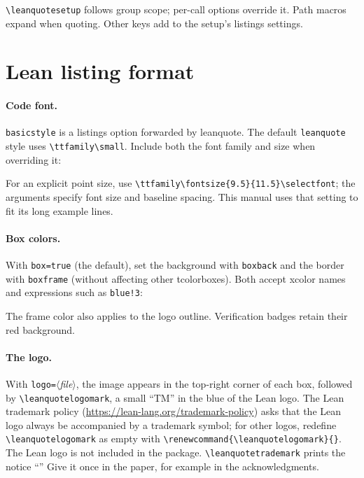 \documentclass[11pt]{article}
\newcommand{\meta}[1]{\ensuremath{\langle}\textit{#1}\ensuremath{\rangle}}
\newcommand{\cs}[1]{\texttt{\textbackslash #1}}
\newcommand{\opt}[1]{\texttt{#1}}
\begin{document}
\cs{leanquotesetup} follows group scope; per-call options override it. Path macros expand
when quoting. Other keys add to the setup's \textsf{listings} settings.

\section{Lean listing format}

\paragraph{Code font.} \opt{basicstyle} is a \textsf{listings} option forwarded by
\textsf{leanquote}. The default \texttt{leanquote} style uses \verb|\ttfamily\small|.
Include both the font family and size when overriding it:
\begin{latexsrc}
\end{latexsrc}
For an explicit point size, use \verb|\ttfamily\fontsize{9.5}{11.5}\selectfont|;
the arguments specify font size and baseline spacing. This manual uses that setting
to fit its long example lines.

\paragraph{Box colors.} With \opt{box=true} (the default), set the background with
\opt{boxback} and the border with \opt{boxframe}
(without affecting other tcolorboxes).
Both accept \textsf{xcolor} names and expressions such as \opt{blue!3}:
\begin{latexsrc}
\end{latexsrc}
\noindent The frame color also applies to the logo outline. Verification badges
retain their red background.

\paragraph{The logo.} With \opt{logo=}\meta{file}, the image appears in the top-right corner of
each box, followed by \cs{leanquotelogomark}, a small ``TM'' in the blue of the Lean logo.
The Lean trademark policy (\url{https://lean-lang.org/trademark-policy}) asks that the Lean logo
always be accompanied by a trademark symbol; for other logos, redefine
\cs{leanquotelogomark} as empty with
\verb|\renewcommand{\leanquotelogomark}{}|. The Lean logo is not included in the package.
\cs{leanquotetrademark} prints the notice ``\leanquotetrademark'' Give it once in the paper,
for example in the acknowledgments.
\end{document}
